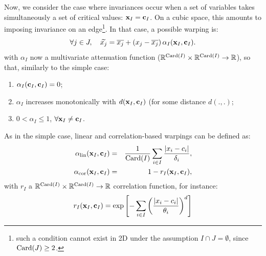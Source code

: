Now, we consider the case where invariances occur when a set of variables takes simultaneously a set of critical values: $\mathbf{x}_I = \mathbf{c}_I$.
On a cubic space, this amounts to imposing invariance on an edge\footnote{such a condition 
cannot exist in 2D under the assumption $I \cap J = \emptyset$, since $\operatorname{Card}(J) \geq 2$.}. In that case, a possible warping is:
\begin{equation}
 \forall j \in J, \quad \widetilde{x_j} = \overline{x_j} + \left( x_j - \overline{x_j}\right) {\alpha_I}(\mathbf{x}_I, \mathbf{c}_I)\label{eq:and}.
\end{equation}
with ${\alpha_I}$ now a multivariate attenuation function ($\mathbb{R}^{\operatorname{Card}(I)} \times \mathbb{R}^{\operatorname{Card}(I)} \rightarrow \mathbb{R}$), so that, similarly to the simple case: 
\begin{enumerate}
 \item $\alpha_I(\mathbf{c}_I, \mathbf{c}_I) = 0$;
 \item $\alpha_I$ increases monotonically with $d(\mathbf{x}_I, \mathbf{c}_I)$ (for some distance $d(.,.)$;
 \item $0 < \alpha_I \leq 1$, $\forall \mathbf{x}_I \neq \mathbf{c}_I$.
\end{enumerate}

As in the simple case, linear and correlation-based warpings can be defined as:
\begin{eqnarray}
 \alpha_\text{lin}(\mathbf{x}_I,  \mathbf{c}_I) &=& \frac{1}{\operatorname{Card}(I)} \sum_{i \in I}\frac{\lvert x_i - c_i \rvert}{\delta_i}, \\
  \alpha_\text{cor}(\mathbf{x}_I,  \mathbf{c}_I) &=& 1 - r_I(\mathbf{x}_I, \mathbf{c}_I),
\end{eqnarray}
with $r_I$ a $\mathbb{R}^{\operatorname{Card}(I)} \times \mathbb{R}^{\operatorname{Card}(I)} \rightarrow \mathbb{R}$ correlation function, for instance:
$$r_I(\mathbf{x}_I, \mathbf{c}_I) = \exp \left[ - \sum_{i \in I}\left(\frac{\lvert x_i - c_i \rvert}{\theta_i}\right)^d \right] $$


